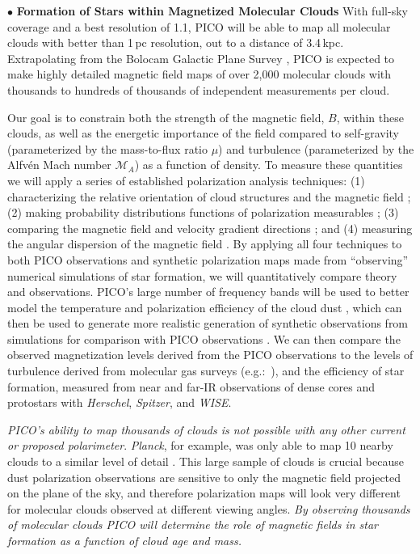 \documentclass[PICOReport.tex]{subfiles}
\begin{document}
\noindent$\bullet$ {\bf Formation of Stars within Magnetized Molecular Clouds} \hspace{0.1in}
With full-sky coverage and a best resolution of 1.1\arcmin, PICO will be able to map all molecular clouds with better than 1\,pc resolution, out to a distance of 3.4\,kpc.  Extrapolating from the Bolocam Galactic Plane Survey \citep[BGPS,][]{EllsworthBowers2015}, PICO is expected 
to make highly detailed magnetic field maps of over 2,000 molecular clouds with thousands to hundreds of thousands of independent measurements per cloud. 

Our goal is to constrain both the strength of the magnetic field, $B$, within these clouds, as well as the energetic importance of the field compared to self-gravity (parameterized by the mass-to-flux ratio $\mu$) and turbulence (parameterized by the Alfv\'{e}n Mach number $\mathcal{M}_A$) as a function of density.
To measure these quantities we will apply a series of established polarization analysis techniques:
(1) characterizing the relative orientation of cloud structures and the magnetic field \citep{Soler2013,Chen2016,Soler2017,Planck:XXXV}; (2) making probability distributions functions of polarization measurables \citep{Fissel2016, King2018}; (3) comparing the magnetic field and velocity gradient directions \citep{GonzalezCasanova2017,Yuen2017,Lazarian2018}; and (4) measuring the angular dispersion of the magnetic field  \citep{Davis1951,Chandrasekhar1953, Hildebrand2009,Houde2009}.
By applying all four techniques to both PICO observations and synthetic polarization maps made from ``observing'' numerical simulations of star formation, we will quantitatively compare theory and observations. PICO's large number of frequency bands will be used to better model the temperature and polarization efficiency of the cloud dust  \citep{Andersson2015}, which can then be used to generate more realistic generation of synthetic observations from simulations for comparison with PICO observations \citep{Seifried2018}. We can then compare the observed magnetization levels derived from the PICO observations to the levels of turbulence derived from molecular gas surveys (e.g.:~\citealt{EllsworthBowers2015, Miville-Deschenes2017}), and the efficiency of star formation, measured from near and far-IR observations of dense cores and protostars with {\em Herschel}, {\em Spitzer}, and {\em WISE}. 

{\em PICO's ability to map thousands of clouds is not possible with any other current or proposed polarimeter}. {\em Planck}, for example, was only able to map 10 nearby clouds to a similar level of detail \citep{Planck:XXXV}. This large sample of clouds is crucial because dust polarization observations are sensitive to only the magnetic field projected on the plane of the sky, and therefore polarization maps will look very different for molecular clouds observed at different viewing angles.  {\em By observing thousands of molecular clouds PICO will determine the role of magnetic fields in star formation as a function of cloud age and mass.}
\end{document}
